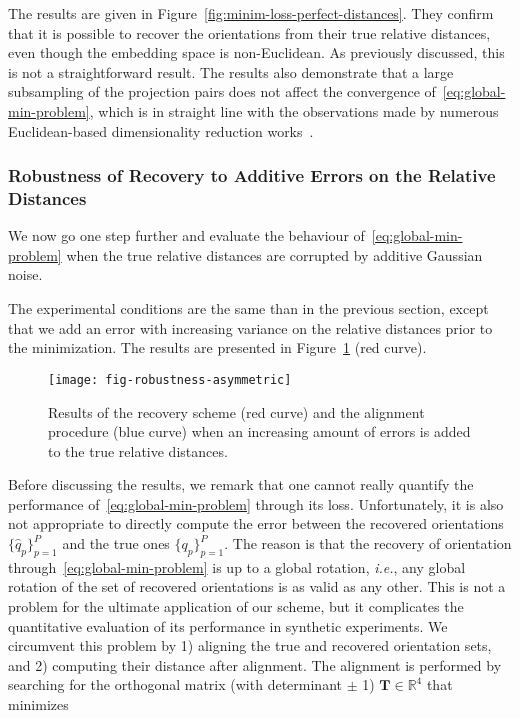 The results are given in Figure~\ref{fig:minim-loss-perfect-distances}. They confirm that it is possible to recover the orientations from their true relative distances, even though the embedding space is non-Euclidean. As previously discussed, this is not a straightforward result. The results also demonstrate that a large subsampling of the projection pairs does not affect the convergence of~\eqref{eq:global-min-problem}, which is in straight line with the observations made by numerous Euclidean-based dimensionality reduction works~\cite{belkin2003laplacian,kruskal1978multidimensional, maaten2008visualizing, mcinnes2018umap}.

\subsubsection{Robustness of Recovery to Additive Errors on the Relative Distances}
\label{subsec:5-6-4-robustness-to-errors}

We now go one step further and evaluate the behaviour of~\eqref{eq:global-min-problem} when the true relative distances are corrupted by  additive Gaussian noise.

The experimental conditions are the same than in the previous section, except that we add an error with increasing variance on the relative distances prior to the minimization. The results are presented in Figure~\ref{fig:recovery-noise-distances} (red curve).

\begin{figure}
    \centering
    \texttt{[image: fig-robustness-asymmetric]}
    \caption{Results of the recovery scheme (red curve) and the alignment procedure (blue curve) when an increasing amount of errors is added to the true relative distances.}
    \label{fig:recovery-noise-distances}
\end{figure}

Before discussing the results, we remark that one cannot really quantify the performance of~\eqref{eq:global-min-problem} through its loss. Unfortunately, it is also not appropriate to directly compute the error between the recovered orientations $\big\{\widehat{q}_p\big\}_{p=1}^P$ and the true ones $\big\{q_p\big\}_{p=1}^P$. The reason is that the recovery of orientation through~\eqref{eq:global-min-problem} is up to a global rotation, \textit{i.e.}, any global rotation of the set of recovered orientations is as valid as any other. This is not a problem for the ultimate application of our scheme, but it complicates the quantitative evaluation of its performance in synthetic experiments. We circumvent this problem by 1) aligning the true and recovered orientation sets, and 2) computing their distance after alignment. The alignment is performed by searching for the orthogonal matrix (with determinant $\pm$ 1) $\mathbf{T}\in\mathbb{R}^4$  that minimizes

